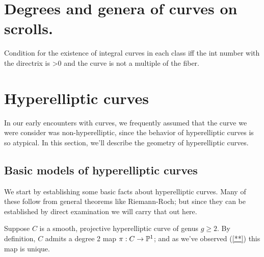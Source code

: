   
  
\section{Degrees and genera of curves on scrolls.} 

Condition for the existence of integral curves in each class iff the int number with the directrix is >0 and the curve is not a multiple of the fiber. 


\section{Hyperelliptic curves}

In our early encounters with curves, we frequently assumed that the curve we were consider was non-hyperelliptic, since the behavior of hyperelliptic curves is so atypical. In this section, we'll describe the geometry of hyperelliptic curves.

\subsection{Basic models of hyperelliptic curves}

We start by establishing some basic facts about hyperelliptic curves. Many of these follow from general theorems like Riemann-Roch; but since they can be established by direct examination we will carry that out here.

Suppose $C$ is a smooth, projective hyperelliptic curve of genus $g \geq 2$. By definition, $C$ admits a degree 2 map $\pi : C \to \PP^1$; and as we've observed (\ref{**}) this map is unique.

